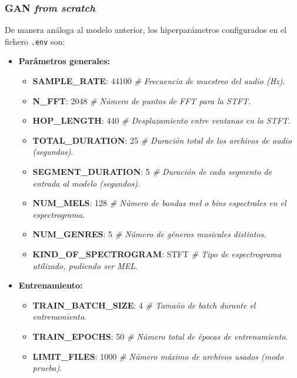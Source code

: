 \subsubsection{GAN \emph{from scratch}}

De manera análoga al modelo anterior, los hiperparámetros configurados en el fichero \texttt{.env} son:

\begin{itemize}
  \item \textbf{Parámetros generales:}
  \begin{itemize}
    \item \textbf{SAMPLE\_RATE}: 44100 \emph{\# Frecuencia de muestreo del audio (Hz)}.
    \item \textbf{N\_FFT}: 2048 \emph{\# Número de puntos de FFT para la STFT}.
    \item \textbf{HOP\_LENGTH}: 440 \emph{\# Desplazamiento entre ventanas en la STFT}.
    \item \textbf{TOTAL\_DURATION}: 25 \emph{\# Duración total de los archivos de audio (segundos)}.
    \item \textbf{SEGMENT\_DURATION}: 5 \emph{\# Duración de cada segmento de entrada al modelo (segundos)}.
    \item \textbf{NUM\_MELS}: 128 \emph{\# Número de bandas mel o bins espectrales en el espectrograma}.
    \item \textbf{NUM\_GENRES}: 5 \emph{\# Número de géneros musicales distintos}.
    \item \textbf{KIND\_OF\_SPECTROGRAM}: STFT \emph{\# Tipo de espectrograma utilizado, pudiendo ser MEL}.
  \end{itemize}

  \item \textbf{Entrenamiento:}
  \begin{itemize}
    \item \textbf{TRAIN\_BATCH\_SIZE}: 4 \emph{\# Tamaño de batch durante el entrenamiento}.
    \item \textbf{TRAIN\_EPOCHS}: 50 \emph{\# Número total de épocas de entrenamiento}.
    \item \textbf{LIMIT\_FILES}: 1000 \emph{\# Número máximo de archivos usados (modo prueba)}.
  \end{itemize}


\end{itemize}
